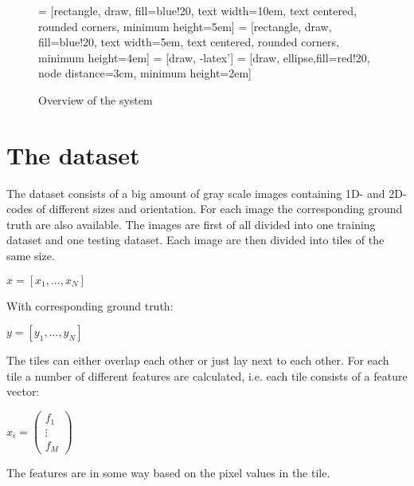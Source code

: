 \begin{figure}[H]
\centering
{} = [rectangle, draw, fill=blue!20, 
    text width=10em, text centered, rounded corners, minimum height=5em]
 = [rectangle, draw, fill=blue!20, 
    text width=5em, text centered, rounded corners, minimum height=4em]
 = [draw, -latex']
 = [draw, ellipse,fill=red!20, node distance=3cm,
    minimum height=2em]
    
\caption{Overview of the system}
\label{system}
\end{figure}

\section{The dataset}
\label{The dataset}
The dataset consists of a big amount of gray scale images containing 1D- and 2D-codes of different sizes and orientation. For each image the corresponding ground truth are also available. The images are first of all divided into one training dataset and one testing dataset. Each image are then divided into tiles of the same size. 
\begin{center}
	$x = [x_1,...,x_N]$
\end{center}
With corresponding ground truth:
\begin{center}
	$y = [y_1,...,y_N]$
\end{center}
The tiles can either overlap each other or just lay next to each other. For each tile a number of different features are calculated, i.e. each tile consists of a feature vector:
\begin{center}
\begin{math}
	x_i =  
	\begin{pmatrix}
		 f_1 \\ \vdots \\ f_M
	\end{pmatrix}
\end{math}
\end{center}  
The features are in some way based on the pixel values in the tile.

